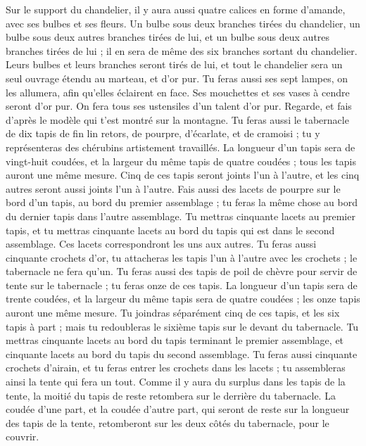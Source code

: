 \begin{multicols}{2}
Sur le support du chandelier, il y aura aussi quatre calices en forme d'amande, avec ses bulbes et ses fleurs.
Un bulbe sous deux branches tirées du chandelier, un bulbe sous deux autres branches tirées de lui, et un bulbe sous deux autres branches tirées de lui ; il en sera de même des six branches sortant du chandelier.
Leurs bulbes et leurs branches seront tirés de lui, et tout le chandelier sera un seul ouvrage étendu au marteau, et d’or pur.
Tu feras aussi ses sept lampes, on les allumera, afin qu'elles éclairent en face.
Ses mouchettes et ses vases à cendre seront d’or pur.
On fera tous ses ustensiles d'un talent d’or pur.
Regarde, et fais d’après le modèle qui t'est montré sur la montagne.
\VerseOne{}Tu feras aussi le tabernacle de dix tapis de fin lin retors, de pourpre, d'écarlate, et de cramoisi ; tu y représenteras des chérubins artistement travaillés.
La longueur d'un tapis sera de vingt-huit coudées, et la largeur du même tapis de quatre coudées ; tous les tapis auront une même mesure.
Cinq de ces tapis seront joints l'un à l'autre, et les cinq autres seront aussi joints l'un à l'autre.
Fais aussi des lacets de pourpre sur le bord d'un tapis, au bord du premier assemblage ; tu feras la même chose au bord du dernier tapis dans l'autre assemblage.
Tu mettras cinquante lacets au premier tapis, et tu mettras cinquante lacets au bord du tapis qui est dans le second assemblage. Ces lacets correspondront les uns aux autres.
Tu feras aussi cinquante crochets d'or, tu attacheras les tapis l'un à l'autre avec les crochets ; le tabernacle ne fera qu’un.
Tu feras aussi des tapis de poil de chèvre pour servir de tente sur le tabernacle ; tu feras onze de ces tapis.
La longueur d'un tapis sera de trente coudées, et la largeur du même tapis sera de quatre coudées ; les onze tapis auront une même mesure.
Tu joindras séparément cinq de ces tapis, et les six tapis à part ; mais tu redoubleras le sixième tapis sur le devant du tabernacle.
Tu mettras cinquante lacets au bord du tapis terminant le premier assemblage, et cinquante lacets au bord du tapis du second assemblage.
Tu feras aussi cinquante crochets d'airain, et tu feras entrer les crochets dans les lacets ; tu assembleras ainsi la tente qui fera un tout.
Comme il y aura du surplus dans les tapis de la tente, la moitié du tapis de reste retombera sur le derrière du tabernacle.
La coudée d’une part, et la coudée d’autre part, qui seront de reste sur la longueur des tapis de la tente, retomberont sur les deux côtés du tabernacle, pour le couvrir.

\end{multicols}
